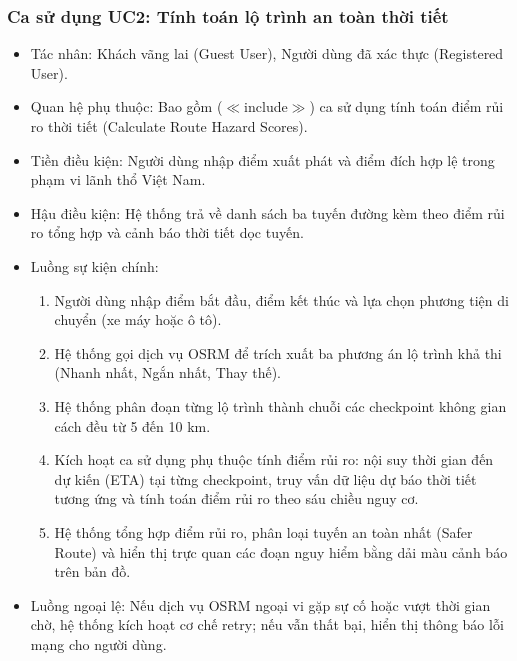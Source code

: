 \subsubsection{Ca sử dụng UC2: Tính toán lộ trình an toàn thời tiết}
\begin{itemize}
    \item Tác nhân: Khách vãng lai (Guest User), Người dùng đã xác thực (Registered User).
    \item Quan hệ phụ thuộc: Bao gồm ($\ll$include$\gg$) ca sử dụng tính toán điểm rủi ro thời tiết (Calculate Route Hazard Scores).
    \item Tiền điều kiện: Người dùng nhập điểm xuất phát và điểm đích hợp lệ trong phạm vi lãnh thổ Việt Nam.
    \item Hậu điều kiện: Hệ thống trả về danh sách ba tuyến đường kèm theo điểm rủi ro tổng hợp và cảnh báo thời tiết dọc tuyến.
    \item Luồng sự kiện chính:
    \begin{enumerate}
        \item Người dùng nhập điểm bắt đầu, điểm kết thúc và lựa chọn phương tiện di chuyển (xe máy hoặc ô tô).
        \item Hệ thống gọi dịch vụ OSRM để trích xuất ba phương án lộ trình khả thi (Nhanh nhất, Ngắn nhất, Thay thế).
        \item Hệ thống phân đoạn từng lộ trình thành chuỗi các checkpoint không gian cách đều từ 5 đến 10 km.
        \item Kích hoạt ca sử dụng phụ thuộc tính điểm rủi ro: nội suy thời gian đến dự kiến (ETA) tại từng checkpoint, truy vấn dữ liệu dự báo thời tiết tương ứng và tính toán điểm rủi ro theo sáu chiều nguy cơ.
        \item Hệ thống tổng hợp điểm rủi ro, phân loại tuyến an toàn nhất (Safer Route) và hiển thị trực quan các đoạn nguy hiểm bằng dải màu cảnh báo trên bản đồ.
    \end{enumerate}
    \item Luồng ngoại lệ: Nếu dịch vụ OSRM ngoại vi gặp sự cố hoặc vượt thời gian chờ, hệ thống kích hoạt cơ chế retry; nếu vẫn thất bại, hiển thị thông báo lỗi mạng cho người dùng.
\end{itemize}

